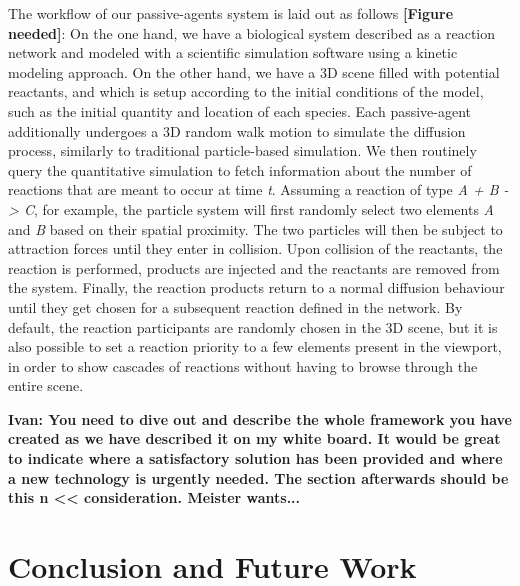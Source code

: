 The workflow of our passive-agents system is laid out as follows \textbf{[Figure needed]}:
On the one hand, we have a biological system described as a reaction network and modeled with a scientific simulation software using a kinetic modeling approach.
On the other hand, we have a 3D scene filled with potential reactants, and which is setup according to the initial conditions of the model, such as the initial quantity and location of each species.
Each passive-agent additionally undergoes a 3D random walk motion to simulate the diffusion process, similarly to traditional particle-based simulation.
We then routinely query the quantitative simulation to fetch information about the number of reactions that are meant to occur at time \textit{t}.
Assuming a reaction of type \textit{A + B -> C}, for example, the particle system will first randomly select two elements \textit{A} and \textit{B} based on their spatial proximity.
The two particles will then be subject to attraction forces until they enter in collision.
Upon collision of the reactants, the reaction is performed, products are injected and the reactants are removed from the system.
Finally, the reaction products return to a normal diffusion behaviour until they get chosen for a subsequent reaction defined in the network.
By default, the reaction participants are randomly chosen in the 3D scene, but it is also possible to set a reaction priority to a few elements present in the viewport, in order to show cascades of reactions without having to browse through the entire scene.

\textbf{Ivan: You need to dive out and describe the whole framework you have created as we have described it on my white board.
It would be great to indicate where a satisfactory solution has been provided and where a new technology is urgently needed.
The section afterwards should be this n << consideration. 
Meister wants...}


\section{Conclusion and Future Work}

